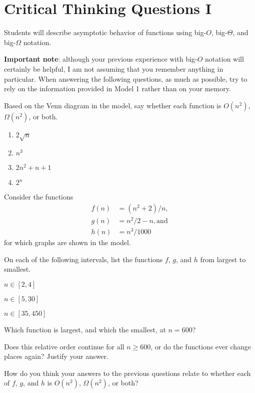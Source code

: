 \documentclass{tufte-handout}
\begin{document}
\newpage
\section{Critical Thinking Questions I}
\begin{objective}
  Students will describe asymptotic behavior of functions
  using big-$O$, big-$\Theta$, and big-$\Omega$ notation.
\end{objective}

\textbf{Important note}: although your previous experience with
big-$O$ notation will certainly be helpful, I am not assuming that you
remember anything in particular.  When answering the following
questions, as much as possible, try to rely on the information
provided in Model 1 rather than on your memory.

\begin{questions}
\item Based on the Venn diagram in the model, say whether each
  function is $O(n^2)$, $\Omega(n^2)$, or both.
  \begin{enumerate}[label=(\alph*)]
    \item $2\sqrt n$
    \item $n^3$
    \item $2n^2 + n + 1$
    \item $2^n$
    \end{enumerate}
\end{questions}
Consider the functions
\begin{align*}
  f(n) &= (n^2 + 2)/n, \\ g(n) &= n^2/2 - n, \text{and} \\ h(n) &= n^3/1000
\end{align*}
for which graphs are shown in the model.
\begin{questions}
  \item On each of the following intervals, list the functions $f$,
    $g$, and $h$ from largest to smallest.
  \begin{subquestions}
  \item $n \in [2,4]$
  \item $n \in [5,30]$
  \item $n \in [35,450]$
  \end{subquestions}
\item Which function is largest, and which the smallest, at $n = 600$?
\item Does this relative order continue for all $n \geq 600$, or do
  the functions ever change places again?  Justify your answer.
  \newpage
\item How do you think your answers to the previous questions relate
  to whether each of $f$, $g$, and $h$ is $O(n^2)$, $\Omega(n^2)$, or both?
\end{questions}
\end{document}
